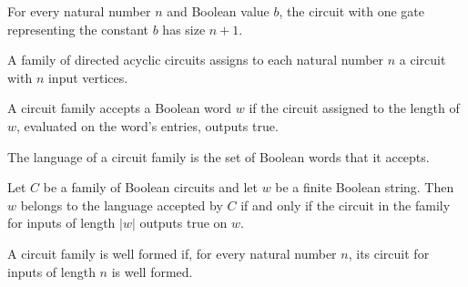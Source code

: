 \begin{theorem}
\label{BoolCircuit.constCircuit_size}
\leanok
{}
For every natural number $n$ and Boolean value $b$, the circuit with one gate
representing the constant $b$ has size $n+1$.
\end{theorem}

\begin{definition}
\label{BoolCircuit.DAGCircuitFamily}
\leanok
{}
A family of directed acyclic circuits assigns to each natural number $n$ a circuit with
$n$ input vertices.
\end{definition}

\begin{definition}
\label{BoolCircuit.DAGCircuitFamily.Accepts}
\leanok
{}
A circuit family accepts a Boolean word $w$ if the circuit assigned to the length of
$w$, evaluated on the word's entries, outputs true.
\end{definition}

\begin{definition}
\label{BoolCircuit.DAGCircuitFamily.language}
\leanok
{}
The language of a circuit family is the set of Boolean words that it accepts.
\end{definition}

\begin{theorem}
\label{BoolCircuit.DAGCircuitFamily.mem_language_iff}
\leanok
{}
Let $C$ be a family of Boolean circuits and let $w$ be a finite Boolean string. Then $w$
belongs to the language accepted by $C$ if and only if the circuit in the family for
inputs of length $|w|$ outputs true on $w$.
\end{theorem}

\begin{definition}
\label{BoolCircuit.DAGCircuitFamily.IsWellFormed}
\leanok
{}
A circuit family is well formed if, for every natural number $n$, its circuit for inputs
of length $n$ is well formed.
\end{definition}

